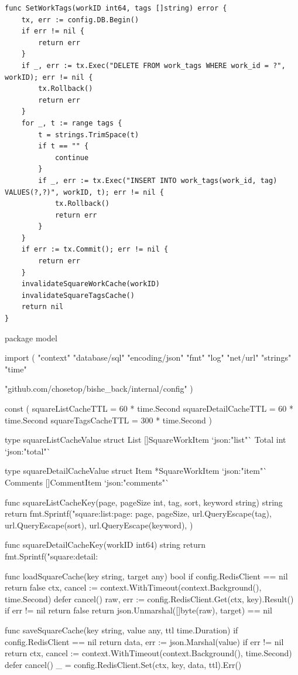 \documentclass[twoside]{thesis-cls-Miya} %
\begin{document}
\begin{verbatim}
func SetWorkTags(workID int64, tags []string) error {
	tx, err := config.DB.Begin()
	if err != nil {
		return err
	}
	if _, err := tx.Exec("DELETE FROM work_tags WHERE work_id = ?", workID); err != nil {
		tx.Rollback()
		return err
	}
	for _, t := range tags {
		t = strings.TrimSpace(t)
		if t == "" {
			continue
		}
		if _, err := tx.Exec("INSERT INTO work_tags(work_id, tag) VALUES(?,?)", workID, t); err != nil {
			tx.Rollback()
			return err
		}
	}
	if err := tx.Commit(); err != nil {
		return err
	}
	invalidateSquareWorkCache(workID)
	invalidateSquareTagsCache()
	return nil
}
\end{verbatim}
\iffalse
package model

import (
	"context"
	"database/sql"
	"encoding/json"
	"fmt"
	"log"
	"net/url"
	"strings"
	"time"

	"github.com/chosetop/bishe_back/internal/config"
)

const (
	squareListCacheTTL   = 60 * time.Second
	squareDetailCacheTTL = 60 * time.Second
	squareTagsCacheTTL   = 300 * time.Second
)

type squareListCacheValue struct {
	List  []SquareWorkItem `json:"list"`
	Total int              `json:"total"`
}

type squareDetailCacheValue struct {
	Item     *SquareWorkItem `json:"item"`
	Comments []CommentItem   `json:"comments"`
}

func squareListCacheKey(page, pageSize int, tag, sort, keyword string) string {
	return fmt.Sprintf("square:list:page:%
		page,
		pageSize,
		url.QueryEscape(tag),
		url.QueryEscape(sort),
		url.QueryEscape(keyword),
	)
}

func squareDetailCacheKey(workID int64) string {
	return fmt.Sprintf("square:detail:%
}

func loadSquareCache(key string, target any) bool {
	if config.RedisClient == nil {
		return false
	}
	ctx, cancel := context.WithTimeout(context.Background(), time.Second)
	defer cancel()
	raw, err := config.RedisClient.Get(ctx, key).Result()
	if err != nil {
		return false
	}
	return json.Unmarshal([]byte(raw), target) == nil
}

func saveSquareCache(key string, value any, ttl time.Duration) {
	if config.RedisClient == nil {
		return
	}
	data, err := json.Marshal(value)
	if err != nil {
		return
	}
	ctx, cancel := context.WithTimeout(context.Background(), time.Second)
	defer cancel()
	_ = config.RedisClient.Set(ctx, key, data, ttl).Err()
}
\end{document}
